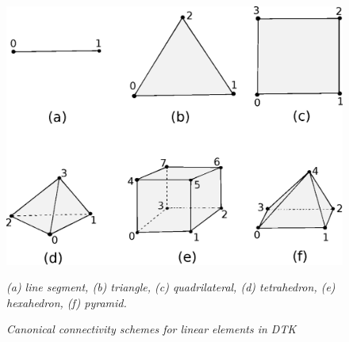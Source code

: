 \documentclass[letterpaper,12pt]{article}
\begin{document}
\begin{figure}[htpb!]
  \centering
  \includegraphics[width=5.5in]{Linear_Elements.eps}
  \caption{\sl Canonical connectivity schemes for linear elements in
    DTK}{\sl (a) line segment, (b) triangle, (c) quadrilateral, (d)
    tetrahedron, (e) hexahedron, (f) pyramid.}
  \label{fig:linear_elements}
\end{figure}

\clearpage

\end{document}
